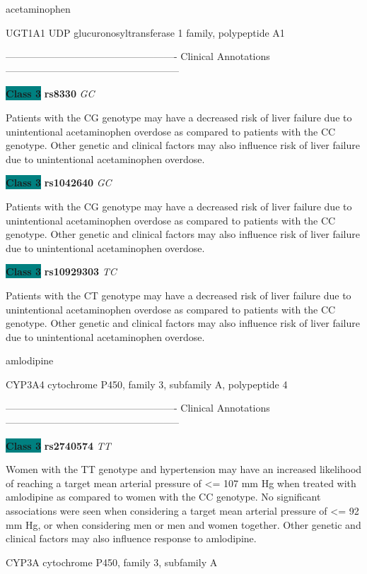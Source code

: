 \documentclass{resume} %
\begin{document}
\begin{rSection}{ acetaminophen }
\begin{rSubsection}{ UGT1A1 }{ UDP glucuronosyltransferase 1 family, polypeptide A1 }{}{}
\item[] ---------------------------------------------------- Clinical Annotations -----------------------------------------------------\newline
\item \textbf{\colorbox{teal} {Class 3}} \textbf{ rs8330 } \textit{ GC }
\item[] Patients with the CG genotype may have a decreased risk of liver failure due to unintentional acetaminophen overdose as compared to patients with the CC genotype. Other genetic and clinical factors may also influence risk of liver failure due to unintentional acetaminophen overdose.\item \textbf{\colorbox{teal} {Class 3}} \textbf{ rs1042640 } \textit{ GC }
\item[] Patients with the CG genotype may have a decreased risk of liver failure due to unintentional acetaminophen overdose as compared to patients with the CC genotype. Other genetic and clinical factors may also influence risk of liver failure due to unintentional acetaminophen overdose.\item \textbf{\colorbox{teal} {Class 3}} \textbf{ rs10929303 } \textit{ TC }
\item[] Patients with the CT genotype may have a decreased risk of liver failure due to unintentional acetaminophen overdose as compared to patients with the CC genotype. Other genetic and clinical factors may also influence risk of liver failure due to unintentional acetaminophen overdose.
\end{rSubsection}

\end{rSection}\begin{rSection}{ amlodipine }
\item[]

\begin{rSubsection}{ CYP3A4 }{ cytochrome P450, family 3, subfamily A, polypeptide 4 }{}{}
\item[]

\item[] ---------------------------------------------------- Clinical Annotations -----------------------------------------------------\newline
\item \textbf{\colorbox{teal} {Class 3}} \textbf{ rs2740574 } \textit{ TT }
\item[] Women with the TT genotype and hypertension may have an increased likelihood of reaching a target mean arterial pressure of <= 107 mm Hg when treated with amlodipine as compared to women with the CC genotype. No significant associations were seen when considering a target mean arterial pressure of <= 92 mm Hg, or when considering men or men and women together. Other genetic and clinical factors may also influence response to amlodipine.
\end{rSubsection}\begin{rSubsection}{ CYP3A }{ cytochrome P450, family 3, subfamily A }{}{}
\item[]


\end{rSubsection}
\end{rSection}
\end{document}
